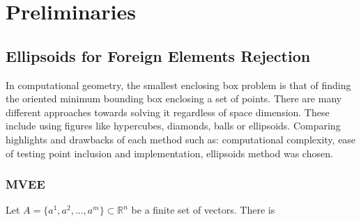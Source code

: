 \documentclass{llncs}
\begin{document}



\section{Preliminaries}
  \label{sec:preliminaries}



\subsection{Ellipsoids for Foreign Elements Rejection}


In computational geometry, the smallest enclosing box problem is that of finding the oriented minimum bounding box enclosing a set of points. There are many different approaches towards solving it regardless of space dimension. These include using figures like hypercubes, diamonds, balls or ellipsoids. Comparing highlights and drawbacks of each method such as: computational complexity, ease of testing point inclusion and implementation, ellipsoids method was chosen.


\subsubsection{MVEE}

Let $A = \{a^{1}, a^{2}, ..., a^{m}\} \subset \mathbb{R} ^{n}$ be a finite set of vectors. There is 


\end{document}
